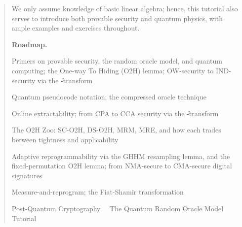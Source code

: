\begin{abstract}
  We only assume knowledge of basic linear algebra; hence,
  this tutorial also serves to introduce both provable security and
  quantum physics, with ample examples and exercises throughout.   

  \vspace{\baselineskip}
  \textbf{Roadmap.}\par\smallskip\noindent
  \begin{description}[font=\ttfamily, labelwidth=3.2em, leftmargin=!, labelsep=1.2em, itemsep=0pt]
    \item[v0.1] Primers on provable security, the random oracle model, and quantum computing;
      the One-way To Hiding (O2H) lemma; OW-security to IND-security via the
      \U-transform  
    \item[v0.2] Quantum pseudocode notation; the compressed oracle technique
    \item[v0.3] Online extractability; from CPA to CCA security via the \U-transform
    \item[v0.4] The O2H Zoo: SC-O2H, DS-O2H, MRM, MRE, and how
      each trades between tightness and applicability
    \item[v1.0] Adaptive reprogrammability via the GHHM resampling lemma, and the
      fixed-permutation O2H lemma; from NMA-secure to CMA-secure digital signatures
    \item[v2.0] Measure-and-reprogram; the Fiat-Shamir transformation
  \end{description}

  \begin{keywords}
    Post-Quantum Cryptography~\textperiodcentered~%
    The Quantum Random Oracle Model~\textperiodcentered~%
    Tutorial 
  \end{keywords}
\end{abstract}

\newpage
\tableofcontents
\newpage
